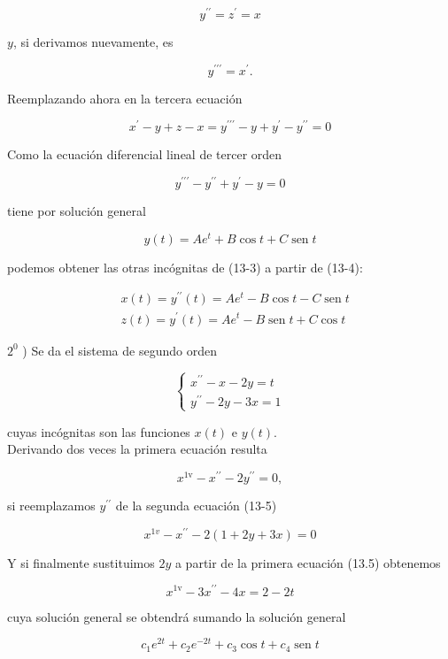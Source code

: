 \documentclass[10pt]{article}
\theoremstyle{plain}
\theoremstyle{definition}
\theoremstyle{remark}
\begin{document}
\begin{equation*}
y^{\prime \prime}=z^{\prime}=x \tag{13-4}
\end{equation*}


$y$, si derivamos nuevamente, es

$$
y^{\prime \prime \prime}=x^{\prime} .
$$

Reemplazando ahora en la tercera ecuación

$$
x^{\prime}-y+z-x=y^{\prime \prime \prime}-y+y^{\prime}-y^{\prime \prime}=0
$$

Como la ecuación diferencial lineal de tercer orden

$$
y^{\prime \prime \prime}-y^{\prime \prime}+y^{\prime}-y=0
$$

tiene por solución general

$$
y(t)=A e^{t}+B \cos t+C \operatorname{sen} t
$$

podemos obtener las otras incógnitas de (13-3) a partir de (13-4):

$$
\begin{aligned}
& x(t)=y^{\prime \prime}(t)=A e^{t}-B \cos t-C \operatorname{sen} t \\
& z(t)=y^{\prime}(t)=A e^{t}-B \operatorname{sen} t+C \cos t
\end{aligned}
$$

$2^{0}$ ) Se da el sistema de segundo orden

\[
\left\{\begin{array}{l}
x^{\prime \prime}-x-2 y=t  \tag{13-5}\\
y^{\prime \prime}-2 y-3 x=1
\end{array}\right.
\]

cuyas incógnitas son las funciones $x(t)$ e $y(t)$.\\
Derivando dos veces la primera ecuación resulta

$$
x^{1 \mathrm{v}}-x^{\prime \prime}-2 y^{\prime \prime}=0,
$$

si reemplazamos $y^{\prime \prime}$ de la segunda ecuación (13-5)


$$
x^{1 v}-x^{\prime \prime}-2(1+2 y+3 x)=0
$$

Y si finalmente sustituimos $2 y$ a partir de la primera ecuación (13.5) obtenemos

$$
x^{1 \mathrm{v}}-3 x^{\prime \prime}-4 x=2-2 t
$$

cuya solución general se obtendrá sumando la solución general

$$
c_{1} e^{2 t}+c_{2} e^{-2 t}+c_{3} \cos t+c_{4} \operatorname{sen} t
$$
\end{document}
